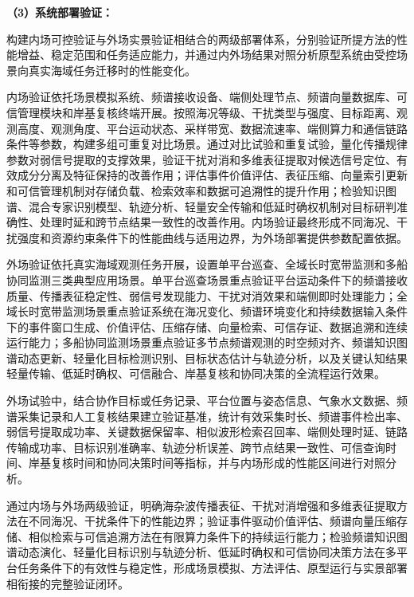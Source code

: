 \textbf{（3）系统部署验证：}

构建内场可控验证与外场实景验证相结合的两级部署体系，分别验证所提方法的性能增益、稳定范围和任务适应能力，并通过内外场结果对照分析原型系统由受控场景向真实海域任务迁移时的性能变化。

内场验证依托场景模拟系统、频谱接收设备、端侧处理节点、频谱向量数据库、可信管理模块和岸基复核终端开展。按照海况等级、干扰类型与强度、目标距离、观测高度、观测角度、平台运动状态、采样带宽、数据流速率、端侧算力和通信链路条件等参数，构建多组可重复对比场景。通过对比试验和重复试验，量化传播规律参数对弱信号提取的支撑效果，验证干扰对消和多维表征提取对候选信号定位、有效成分分离及特征保持的改善作用；评估事件价值评估、表征压缩、向量索引更新和可信管理机制对存储负载、检索效率和数据可追溯性的提升作用；检验知识图谱、混合专家识别模型、轨迹分析、轻量安全传输和低延时确权机制对目标研判准确性、处理时延和跨节点结果一致性的改善作用。内场验证最终形成不同海况、干扰强度和资源约束条件下的性能曲线与适用边界，为外场部署提供参数配置依据。

外场验证依托真实海域观测任务开展，设置单平台巡查、全域长时宽带监测和多船协同监测三类典型应用场景。单平台巡查场景重点验证平台运动条件下的频谱接收质量、传播表征稳定性、弱信号发现能力、干扰对消效果和端侧即时处理能力；全域长时宽带监测场景重点验证系统在海况变化、频谱环境变化和持续数据输入条件下的事件窗口生成、价值评估、压缩存储、向量检索、可信存证、数据追溯和连续运行能力；多船协同监测场景重点验证多节点频谱观测的时空频对齐、频谱知识图谱动态更新、轻量化目标检测识别、目标状态估计与轨迹分析，以及关键认知结果轻量传输、低延时确权、可信融合、岸基复核和协同决策的全流程运行效果。

外场试验中，结合协作目标或任务记录、平台位置与姿态信息、气象水文数据、频谱采集记录和人工复核结果建立验证基准，统计有效采集时长、频谱事件检出率、弱信号提取成功率、关键数据保留率、相似波形检索召回率、端侧处理时延、链路传输成功率、目标识别准确率、轨迹分析误差、跨节点结果一致性、可信查询时间、岸基复核时间和协同决策时间等指标，并与内场形成的性能区间进行对照分析。

通过内场与外场两级验证，明确海杂波传播表征、干扰对消增强和多维表征提取方法在不同海况、干扰条件下的性能边界；验证事件驱动价值评估、频谱向量压缩存储、相似检索与可信追溯方法在有限算力条件下的持续运行能力；检验频谱知识图谱动态演化、轻量化目标识别与轨迹分析、低延时确权和可信协同决策方法在多平台任务条件下的有效性与稳定性，形成场景模拟、方法评估、原型运行与实景部署相衔接的完整验证闭环。



